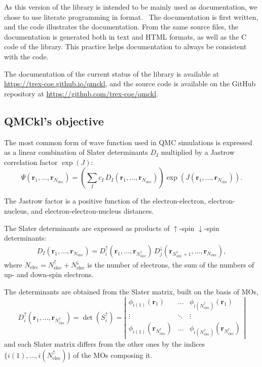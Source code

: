 As this version of the library is intended to be mainly used as documentation, 
we chose to use literate programming\cite{knuth_1992} in {\orgmode}
format.~\cite{schulte_2012,orgmode} The documentation
is first written, and the code illustrates the documentation. From the same source files,
the documentation is generated both in text and HTML formats, as well as the C code of the library.
This practice helps documentation to always be consistent with the code.

The documentation of the current status of the library is available
at \url{https://trex-coe.github.io/qmckl}, and the source code is
available on the GitHub repository at \url{https://github.com/trex-coe/qmckl}.

\subsection{QMCkl's objective}

\newcommand{\Nelec}{N_{\text{elec}}}
\newcommand{\Nelecup}{N_{\text{elec}}^\uparrow}
\newcommand{\Nelecdn}{N_{\text{elec}}^\downarrow}
\newcommand{\br}{\mathbf{r}_1,\dots,\mathbf{r}_{\Nelec}}
\newcommand{\brup}{\mathbf{r}_1,\dots,\mathbf{r}_{\Nelec^\uparrow}}
\newcommand{\brdn}{\mathbf{r}_{\Nelec^\uparrow+1},\dots,\mathbf{r}_{\Nelec}}

The most common form of wave function used in \ac{QMC} simulations is
expressed as a linear combination of Slater determinants $D_I$ multiplied by
a Jastrow correlation factor $\exp(J)$:
\begin{equation}
  \Psi(\br) = \left( \sum_I c_I\, D_I(\br) \right) \exp \left( J(\br) \right).
\end{equation}

The Jastrow factor is a positive function of the electron-electron,
electron-nucleus, and electron-electron-nucleus distances. 

The Slater determinants are expressed as products of $\uparrow$-spin
$\downarrow$-spin determinants:
\begin{eqnarray}
D_I(\br) = D_i^\uparrow(\brup)\, D_j^\downarrow(\brdn),
\end{eqnarray}
where $\Nelec = \Nelecup + \Nelecdn$ is the number of
electrons, the sum of the numbers of up- and down-spin electrons.

The determinants are obtained from the Slater matrix, built on the basis of \acp{MO},
\begin{equation}
  D_i^\uparrow(\brup) = \det(S_i^\uparrow) = \left|
    \begin{array}{ccc}
      \phi_{i(1)}(\mathbf{r}_1) & \dots & \phi_{i(\Nelecup)}(\mathbf{r}_1) \\
        \vdots & \ddots & \vdots \\
      \phi_{i(1)}(\mathbf{r}_{\Nelecup}) & \dots & \phi_{i(\Nelecup)}(\mathbf{r}_{\Nelecup}) 
    \end{array}
    \right|
\end{equation}
and each Slater matrix differs from the other ones by the indices $\{
i(1), \dots, i(\Nelecup) \}$ of the \acp{MO} composing it.

